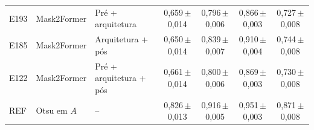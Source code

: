\begin{table}[htbp]
\begin{sbcfitwidth}
\begin{tabular}{lllcccc}
E193 & Mask2Former & Pré + arquitetura & 0{,}659\,{\scriptsize$\pm$0{,}014} & 0{,}796\,{\scriptsize$\pm$0{,}006} & 0{,}866\,{\scriptsize$\pm$0{,}003} & 0{,}727\,{\scriptsize$\pm$0{,}008} \\
E185 & Mask2Former & Arquitetura + pós & 0{,}650\,{\scriptsize$\pm$0{,}014} & 0{,}839\,{\scriptsize$\pm$0{,}007} & 0{,}910\,{\scriptsize$\pm$0{,}004} & 0{,}744\,{\scriptsize$\pm$0{,}008} \\
E122 & Mask2Former & Pré + arquitetura + pós & 0{,}661\,{\scriptsize$\pm$0{,}014} & 0{,}800\,{\scriptsize$\pm$0{,}006} & 0{,}869\,{\scriptsize$\pm$0{,}003} & 0{,}730\,{\scriptsize$\pm$0{,}008} \\
\midrule
REF & Otsu em $A$ & -- & 0{,}826\,{\scriptsize$\pm$0{,}013} & 0{,}916\,{\scriptsize$\pm$0{,}005} & 0{,}951\,{\scriptsize$\pm$0{,}003} & 0{,}871\,{\scriptsize$\pm$0{,}008} \\
\bottomrule
\end{tabular}
\end{sbcfitwidth}
\end{table}
